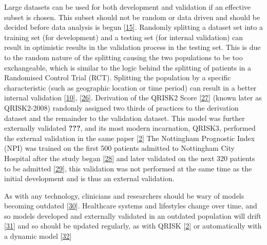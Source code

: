\documentclass[
]{article}
\begin{document}
Large datasets can be used for both development and validation if an effective subset is chosen. This subset should not be random or data driven and should be decided before data analysis is begun {[}\protect\hyperlink{ref-riley_external_2016}{15}{]}. Randomly splitting a dataset set into a training set (for development) and a testing set (for internal validation) can result in optimistic results in the validation process in the testing set. This is due to the random nature of the splitting causing the two populations to be too exchangeable, which is similar to the logic behind the splitting of patients in a Randomised Control Trial (RCT). Splitting the population by a specific characteristic (such as geographic location or time period) can result in a better internal validation {[}\protect\hyperlink{ref-altman_prognosis_2009}{10}{]}, {[}\protect\hyperlink{ref-ivanov_predictive_2000}{26}{]}. Derivation of the QRISK2 Score {[}\protect\hyperlink{ref-hippisley-cox_derivation_2007}{27}{]} (known later as QRISK2-2008) randomly assigned two thirds of practices to the derivation dataset and the remainder to the validation dataset. This model was further externally validated {\textbf{???}}, and its most modern incarnation, QRISK3, performed the external validation in the same paper {[}\protect\hyperlink{ref-hippisley-cox_development_2017}{2}{]} The Nottingham Prognostic Index (NPI) was trained on the first 500 patients admitted to Nottingham City Hospital after the study began {[}\protect\hyperlink{ref-haybittle_prognostic_1982}{28}{]} and later validated on the next 320 patients to be admitted {[}\protect\hyperlink{ref-todd_confirmation_1987}{29}{]}, this validation was not performed at the same time as the initial development and is thus an external validation.

As with any technology, clinicians and researchers should be wary of models becoming outdated {[}\protect\hyperlink{ref-pate_uncertainty_2019}{30}{]}. Healthcare systems and lifestyles change over time, and so models developed and externally validated in an outdated population will drift {[}\protect\hyperlink{ref-bhatnagar_epidemiology_2015}{31}{]} and so should be updated regularly, as with QRISK {[}\protect\hyperlink{ref-hippisley-cox_development_2017}{2}{]} or automatically with a dynamic model {[}\protect\hyperlink{ref-jenkins_dynamic_2018}{32}{]}
\end{document}
